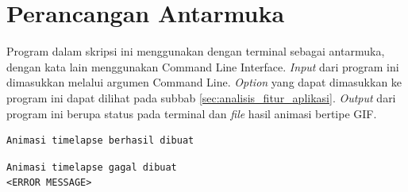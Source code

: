 \section{Perancangan Antarmuka}
\label{sec:perancangan_antarmuka}
Program dalam skripsi ini menggunakan dengan terminal sebagai antarmuka, dengan kata lain menggunakan Command Line Interface. \textit{Input} dari program ini dimasukkan melalui argumen Command Line. \textit{Option} yang dapat dimasukkan ke program ini dapat dilihat pada subbab \ref{sec:analisis_fitur_aplikasi}. \textit{Output} dari program ini berupa status pada terminal dan \textit{file} hasil animasi bertipe GIF.  

\begin{lstlisting}[caption={Status pesan yang akan muncul pada terminal saat program berhasil membangkitkan animasi \textit{timelapse}.},label={lst:status_pesan_berhasil},language=plaintext]
Animasi timelapse berhasil dibuat
\end{lstlisting}

\begin{lstlisting}[caption={Status pesan yang akan muncul pada terminal saat program gagal membangkitkan animasi \textit{timelapse}.},label={lst:status_pesan_gagal},language=plaintext]
Animasi timelapse gagal dibuat
<ERROR MESSAGE>
\end{lstlisting}


